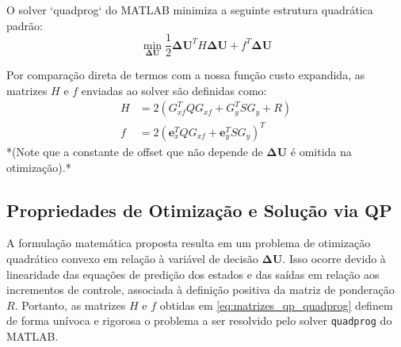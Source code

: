 \documentclass[12pt]{article}
\begin{document}
O solver `quadprog` do MATLAB minimiza a seguinte estrutura quadrática padrão:
\begin{equation}
\min_{\bm{\Delta U}} \frac{1}{2} \bm{\Delta U}^T H \bm{\Delta U} + f^T \bm{\Delta U}
\end{equation}

Por comparação direta de termos com a nossa função custo expandida, as matrizes $H$ e $f$ enviadas ao solver são definidas como:
\begin{align}
\label{eq:matrizes_qp_quadprog}
H &= 2 \left( G_{xf}^T Q G_{xf} + G_y^T S G_y + R \right) \\
f &= 2 \left( \bm{e}_x^T Q G_{xf} + \bm{e}_y^T S G_y \right)^T
\end{align}
*(Note que a constante de offset que não depende de $\bm{\Delta U}$ é omitida na otimização).*

\subsection{Propriedades de Otimização e Solução via QP}
\label{subsec:conclusao}
A formulação matemática proposta resulta em um problema de otimização quadrático convexo em relação à variável de decisão $\bm{\Delta U}$. Isso ocorre devido à linearidade das equações de predição dos estados e das saídas em relação aos incrementos de controle, associada à definição positiva da matriz de ponderação $R$. Portanto, as matrizes $H$ e $f$ obtidas em \eqref{eq:matrizes_qp_quadprog} definem de forma unívoca e rigorosa o problema a ser resolvido pelo solver \texttt{quadprog} do MATLAB.
\end{document}
